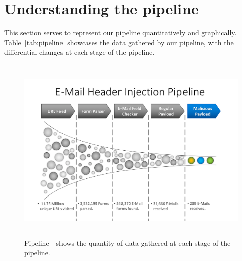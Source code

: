 \section[The Pipeline]{Understanding the pipeline}
This section serves to represent our pipeline quantitatively and graphically. Table~\ref{tab:pipeline} showcases the data gathered by our pipeline, with the differential changes at each stage of the pipeline. 


\begin{figure}
	\centering
	\includegraphics[width=16cm, height=9cm]{Results/emailheaderpipeline}
	\caption[E-Mail header injection Pipeline]{Pipeline - shows the quantity of data gathered at each stage of the pipeline.}
	\label{fig:pipeline}
\end{figure}